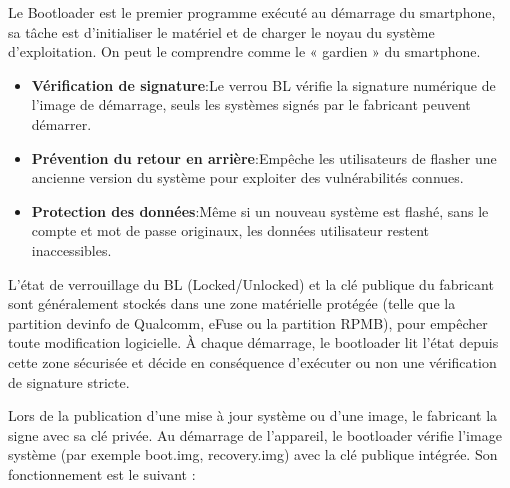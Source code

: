 


Le Bootloader est le premier programme exécuté au démarrage du smartphone, sa tâche est d'initialiser le matériel et de charger le noyau du système d'exploitation. On peut le comprendre comme le « gardien » du smartphone.


\begin{itemize}
  \item \textbf{Vérification de signature}:Le verrou BL vérifie la signature numérique de l'image de démarrage, seuls les systèmes signés par le fabricant peuvent démarrer.
  \item \textbf{Prévention du retour en arrière}:Empêche les utilisateurs de flasher une ancienne version du système pour exploiter des vulnérabilités connues.
  \item \textbf{Protection des données}:Même si un nouveau système est flashé, sans le compte et mot de passe originaux, les données utilisateur restent inaccessibles.
\end{itemize}


L'état de verrouillage du BL (Locked/Unlocked) et la clé publique du fabricant sont généralement stockés dans une zone matérielle protégée (telle que la partition devinfo de Qualcomm, eFuse ou la partition RPMB), pour empêcher toute modification logicielle. À chaque démarrage, le bootloader lit l'état depuis cette zone sécurisée et décide en conséquence d'exécuter ou non une vérification de signature stricte.


Lors de la publication d'une mise à jour système ou d'une image, le fabricant la signe avec sa clé privée. Au démarrage de l'appareil, le bootloader vérifie l'image système (par exemple boot.img, recovery.img) avec la clé publique intégrée. Son fonctionnement est le suivant :

